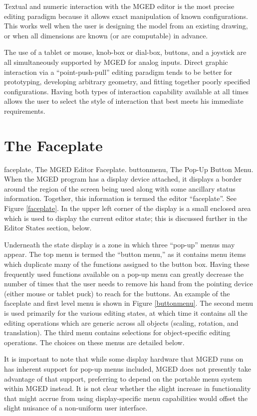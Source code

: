 Textual and numeric interaction with the MGED editor is the most
precise editing paradigm because it allows exact
manipulation of known configurations.
This works well when the user is designing the model
from an existing drawing, or when all dimensions are known (or are computable)
in advance.

The use of a
tablet or mouse, knob-box or dial-box, buttons, and a joystick
are all simultaneously supported by MGED for analog inputs.
Direct graphic interaction via a ``point-push-pull'' editing paradigm
tends to be better for
prototyping, developing arbitrary geometry, and fitting
together poorly specified configurations.
Having both types of interaction capability available at all times
allows the user to select the style of interaction that best
meets his immediate requirements.

\section{The Faceplate}

\mfig faceplate, The MGED Editor Faceplate.
\mfig buttonmenu, The Pop-Up Button Menu.
When the MGED program has a display device attached, it
displays a border around the region of the screen being used
along with some ancillary status information.  Together, this
information is termed the editor ``faceplate''.
See Figure \ref{faceplate}.
In the upper left corner of the display is a small enclosed area
which is used to display the current editor state;
this is discussed further in the Editor States section, below.

Underneath the state display is a zone in which three ``pop-up'' menus
may appear.
The top menu is termed the ``button menu,'' as it
contains menu items which duplicate many of the functions assigned to
the button box.
Having these frequently used
functions available on a pop-up menu
can greatly decrease the number of times that the user needs to remove
his hand from the pointing device (either mouse or tablet puck)
to reach for the buttons.
An example of the faceplate and first level menu is shown in
Figure \ref{buttonmenu}.
The second menu is used primarily for the various editing states,
at which time it contains all the editing operations which are generic
across all objects (scaling, rotation, and translation).
The third menu contains selections for object-specific editing operations.
The choices on these menus are detailed below.

It is important to note that while some display hardware that MGED runs on
has inherent support for pop-up menus included, MGED does not
presently take advantage of that support, preferring to depend
on the portable menu system within MGED instead.
It is not clear whether the slight increase in functionality that might
accrue from using display-specific menu capabilities would offset the
slight nuisance of a non-uniform user interface.

